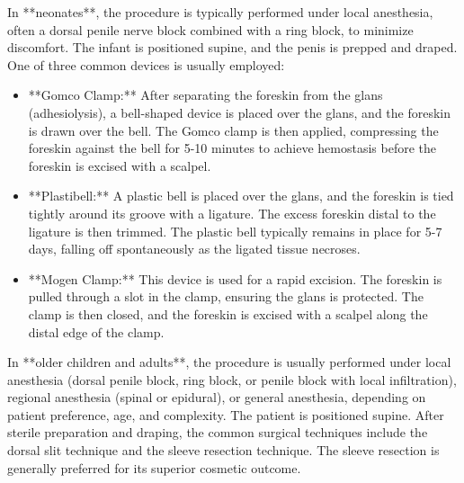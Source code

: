 In **neonates**, the procedure is typically performed under local anesthesia, often a dorsal penile nerve block combined with a ring block, to minimize discomfort. The infant is positioned supine, and the penis is prepped and draped. One of three common devices is usually employed:
\begin{itemize}
  \item **Gomco Clamp:** After separating the foreskin from the glans (adhesiolysis), a bell-shaped device is placed over the glans, and the foreskin is drawn over the bell. The Gomco clamp is then applied, compressing the foreskin against the bell for 5-10 minutes to achieve hemostasis before the foreskin is excised with a scalpel.
  \item **Plastibell:** A plastic bell is placed over the glans, and the foreskin is tied tightly around its groove with a ligature. The excess foreskin distal to the ligature is then trimmed. The plastic bell typically remains in place for 5-7 days, falling off spontaneously as the ligated tissue necroses.
  \item **Mogen Clamp:** This device is used for a rapid excision. The foreskin is pulled through a slot in the clamp, ensuring the glans is protected. The clamp is then closed, and the foreskin is excised with a scalpel along the distal edge of the clamp.
\end{itemize}

In **older children and adults**, the procedure is usually performed under local anesthesia (dorsal penile block, ring block, or penile block with local infiltration), regional anesthesia (spinal or epidural), or general anesthesia, depending on patient preference, age, and complexity. The patient is positioned supine. After sterile preparation and draping, the common surgical techniques include the dorsal slit technique and the sleeve resection technique. The sleeve resection is generally preferred for its superior cosmetic outcome.

